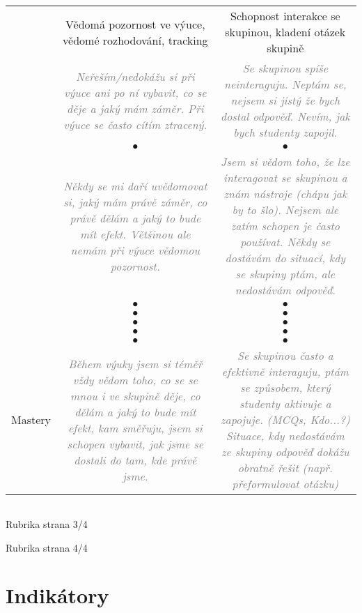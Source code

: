\documentclass[twoside,openany,10pt]{book}
\newcommand{\note}[1]{\textcolor{gray}{\small\itshape #1}}
\begin{document}
\begin{tabularx}{\textwidth}{l@{}CC@{}}
&
Vědomá pozornost ve výuce, vědomé rozhodování, tracking &
Schopnost interakce se skupinou, kladení otázek skupině \\
&
\note{Neřeším/nedokážu si při výuce ani po ní vybavit, co se děje a jaký mám záměr. Při výuce se často cítím ztracený.} &
\note{Se skupinou spíše neinteraguju. Neptám se, nejsem si jistý že bych dostal odpověď. Nevím, jak bych studenty zapojil.} \\
& $\bullet$ & $\bullet$ \\
&
\note{Někdy se mi daří uvědomovat si, jaký mám právě záměr, co právě dělám a jaký to bude mít efekt. Většinou ale nemám při výuce vědomou pozornost.} &
\note{Jsem si vědom toho, že lze interagovat se skupinou a znám nástroje (chápu jak by to šlo). Nejsem ale zatím schopen je často používat. Někdy se dostávám do situací, kdy se skupiny ptám, ale nedostávám odpověď.} \\ \hline
& $\bullet$ & $\bullet$ \\
& $\bullet$ & $\bullet$ \\
& $\bullet$ & $\bullet$ \\
& $\bullet$ & $\bullet$ \\
& $\bullet$ & $\bullet$ \\
\begin{turn}{90} Mastery \end{turn}&
\note{Během výuky jsem si téměř vždy vědom toho, co se se mnou i ve skupině děje, co dělám a jaký to bude mít efekt, kam směřuju, jsem si schopen vybavit, jak jsme se dostali do tam, kde právě jsme.} &
\note{Se skupinou často a efektivně interaguju, ptám se způsobem, který studenty aktivuje a zapojuje. (MCQs, Kdo...?) Situace, kdy nedostávám ze skupiny odpověď dokážu obratně řešit (např. přeformulovat otázku)} \\ \hline
\end{tabularx}

\newpage
\begin{tabularx}{\textwidth}{Xcc}

\end{tabularx}

\newpage
Rubrika strana 3/4

\newpage
Rubrika strana 4/4

\chapter*{Indikátory}
\label{indikatory}
\end{document}
